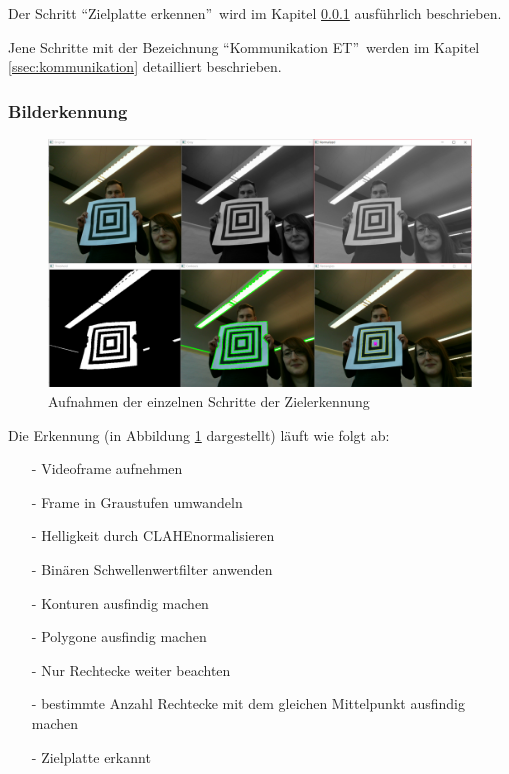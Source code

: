 \documentclass[a4paper]{report}
\begin{document}
Der Schritt \textquotedblleft Zielplatte erkennen\textquotedblright\ wird im Kapitel \ref{ssec:bilderkennung} ausführlich beschrieben.

Jene Schritte mit der Bezeichnung \textquotedblleft Kommunikation ET\textquotedblright\ werden im Kapitel \ref{ssec:kommunikation} detailliert beschrieben.

\subsubsection{Bilderkennung}
\label{ssec:bilderkennung}

\begin{figure}[h!]
	\centering
	\includegraphics[keepaspectratio,width=\textwidth]{BilderkennungAblauf}
	\caption{Aufnahmen der einzelnen Schritte der Zielerkennung}
	\label{fig:AufnahmeZielerkennung}
\end{figure}

Die Erkennung (in Abbildung \ref{fig:AufnahmeZielerkennung} dargestellt) läuft wie folgt ab:

\begin{itemize}[noitemsep]
	\item[-] Videoframe aufnehmen
	\item[-] Frame in Graustufen umwandeln
	\item[-] Helligkeit durch CLAHE\footnotemark normalisieren
	\item[-] Binären Schwellenwertfilter anwenden
	\item[-] Konturen ausfindig machen
	\item[-] Polygone ausfindig machen
	\item[-] Nur Rechtecke weiter beachten
	\item[-] bestimmte Anzahl Rechtecke mit dem gleichen Mittelpunkt ausfindig machen
	\item[-] Zielplatte erkannt
\end{itemize}
\end{document}
